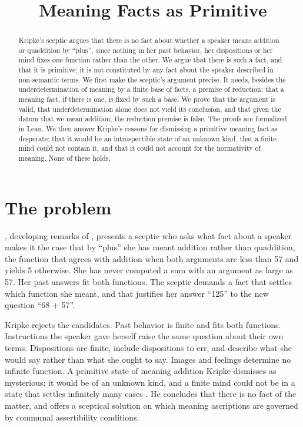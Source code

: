 \documentclass{situationist-preprint}
\title{Meaning Facts as Primitive}
\begin{document}
\maketitle

\begin{abstract}
Kripke's sceptic argues that there is no fact about whether a speaker means addition or quaddition by \enquote{plus}, since nothing in her past behavior, her dispositions or her mind fixes one function rather than the other. We argue that there is such a fact, and that it is primitive: it is not constituted by any fact about the speaker described in non-semantic terms. We first make the sceptic's argument precise. It needs, besides the underdetermination of meaning by a finite base of facts, a premise of reduction: that a meaning fact, if there is one, is fixed by such a base. We prove that the argument is valid, that underdetermination alone does not yield its conclusion, and that given the datum that we mean addition, the reduction premise is false. The proofs are formalized in Lean. We then answer Kripke's reasons for dismissing a primitive meaning fact as desperate: that it would be an introspectible state of an unknown kind, that a finite mind could not contain it, and that it could not account for the normativity of meaning. None of these holds.
\end{abstract}

\section{The problem}

\citet{Kripke1982}, developing remarks of \citet[\S\S185--242]{Wittgenstein1953}, presents a sceptic who asks what fact about a speaker makes it the case that by \enquote{plus} she has meant addition rather than quaddition, the function that agrees with addition when both arguments are less than 57 and yields 5 otherwise. She has never computed a sum with an argument as large as 57. Her past answers fit both functions. The sceptic demands a fact that settles which function she meant, and that justifies her answer \enquote{125} to the new question \enquote{68 + 57}.

Kripke rejects the candidates. Past behavior is finite and fits both functions. Instructions the speaker gave herself raise the same question about their own terms. Dispositions are finite, include dispositions to err, and describe what she would say rather than what she ought to say. Images and feelings determine no infinite function. A primitive state of meaning addition Kripke dismisses as mysterious: it would be of an unknown kind, and a finite mind could not be in a state that settles infinitely many cases \citep[ch.~2]{Kripke1982}. He concludes that there is no fact of the matter, and offers a sceptical solution on which meaning ascriptions are governed by communal assertibility conditions.
\end{document}
